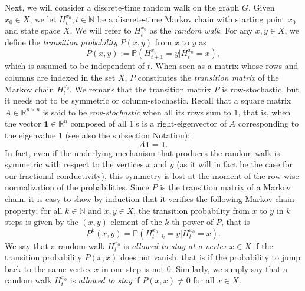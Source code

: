 \documentclass[a4paper,11pt,oneside]{amsart}
\newcommand{\R}{{\mathbb R}}
\newcommand{\N}{{\mathbb N}}
\begin{document}
Next, we will consider a discrete-time random walk on the graph $G$. Given $x_0\in X$, we let $H^{x_0}_t, t\in\N$ be a discrete-time Markov chain with starting point $x_0$ and state space $X$. We will refer to $H^{x_0}_t$ as the \emph{random walk}. For any $x,y\in X$, we define the \emph{transition probability} $P(x,y)$ from $x$ to $y$ as 
$$P(x,y):= \mathbb P(H^{x_0}_{t+1}=y|H^{x_0}_t=x),$$
which is assumed to be independent of $t$. When seen as a matrix whose rows and columns are indexed in the set $X$, $P$ constitutes the \emph{transition matrix} of the Markov chain $H^{x_0}_t$. We remark that the transition matrix $P$ is row-stochastic, but it needs not to be symmetric or column-stochastic. Recall that a square matrix $A\in\R^{n\times n}$ is said to be \emph{row-stochastic} when all its rows sum to $1$, that is, when the vector $\mathbf 1\in \R^{n}$ composed of all $1$'s is a right-eigenvector of $A$ corresponding to the eigenvalue $1$ (see also the subsection Notation):
$$ A\mathbf 1 = \mathbf 1.$$
\noindent In fact, even if the underlying mechanism that produces the random walk is symmetric with respect to the vertices $x$ and $y$ (as it will in fact be the case for our fractional conductivity), this symmetry is lost at the moment of the row-wise normalization of the probabilities.
Since $P$ is the transition matrix of a Markov chain, it is easy to show by induction that it verifies the following Markov chain property: for all $k\in\N$ and $x,y\in X$, the transition probability from $x$ to $y$ in $k$ steps is given by the $(x,y)$ element of the $k$-th power of $P$, that is
$$P^k(x,y)= \mathbb P(H^{x_0}_{t+k}=y|H^{x_0}_t=x).$$
We say that a random walk $H^{x_0}_t$ is \emph{allowed to stay at a vertex} $x\in X$ if the transition probability $P(x,x)$ does not vanish, that is if the probability to jump back to the same vertex $x$ in one step is not $0$. Similarly, we simply say that a random walk $H^{x_0}_t$ is \emph{allowed to stay} if $P(x,x)\neq 0$ for all $x\in X$. 
\end{document}
